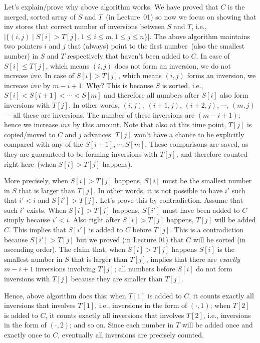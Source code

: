 Let's explain/prove why above algorithm works. We have proved that $C$ is the merged, sorted array of $S$ and $T$~(in Lecture~01)
so now we focus on showing that inv stores that correct number of inversions between $S$ and $T$, 
   i.e., $|\{(i,j)\mid S[i] > T[j], 1\le i \le m, 1\le j \le n\}|$.
The above algorithm maintains two pointers $i$ and $j$ that
(always) point to the first number~(also the smallest number) in $S$ and $T$ respectively that haven't been added to $C$.
In case of $S[i] \le T[j]$, which means $(i, j)$ does not form an inversion, we do not increase $inv$.
In case of $S[i] > T[j]$, which means $(i, j)$ forms an inversion, we increase $inv$ by $m-i+1$.
Why? This is because $S$ is sorted, i.e., $S[i] < S[i+1] < \cdots < S[m]$ and therefore all numbers after $S[i]$ also form inversions
with $T[j]$. In other words, $(i, j)$, $(i+1, j)$, $(i+2, j)$, $\cdots$, $(m, j)$ --- all these are inversions.
The number of these inversions are $(m-i+1)$; hence we increase $inv$ by this amount.
Note that also at this time point, $T[j]$ is copied/moved to $C$ and $j$ advances. $T[j]$ won't have a chance to be explicitly compared
with any of the $S[i+1], \cdots, S[m]$. These comparisons are saved, as they are guaranteed to be forming inversions with $T[j]$, and 
therefore counted right here~(when $S[i] > T[j]$ happens).

More precisely, when $S[i] > T[j]$ happens, 
$S[i]$ must be the smallest number in $S$ that is larger than $T[j]$.
In other words, it is not possible to have $i'$ such that $i' < i$ and $S[i'] > T[j]$.
Let's prove this by contradiction. Assume that such $i'$ exists. 
When $S[i] > T[j]$ happens, $S[i']$ must have been added to $C$ simply because $i' < i$.
Also right after $S[i] > T[j]$ happens, $T[j]$ will be added $C$.
This implies that $S[i']$ is added to $C$ before $T[j]$. This is a contradiction
because $S[i'] > T[j]$ but we proved (in Lecture 01) that $C$ will be sorted (in ascending order).
The claim that, when $S[i] > T[j]$ happens 
$S[i]$ is the smallest number in $S$ that is larger than $T[j]$, implies that
there are \emph{exactly} $m-i+1$ inversions involving $T[j]$; all numbers before $S[i]$ do not form inversions with $T[j]$ because
they are smaller than $T[j]$.

Hence, above algorithm does this: when $T[1]$ is added to $C$, it counts exactly all inversions that involves $T[1]$, i.e.,
inversions in the form of $(\cdot, 1)$;
when $T[2]$ is added to $C$, it counts exactly all inversions that involves $T[2]$, i.e.,
inversions in the form of $(\cdot, 2)$; and so on.
Since each number in $T$ will be added once and exactly once to $C$, eventually all inversions are precisely counted.


